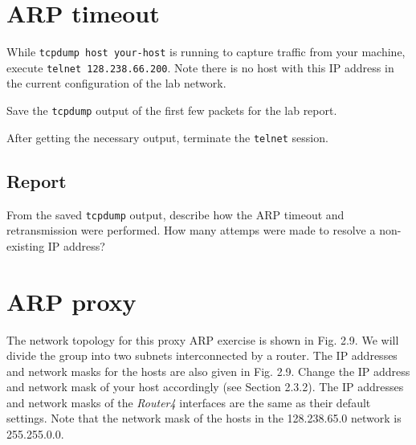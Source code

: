 \documentclass{../UTNetLab}
\begin{document}
\section{ARP timeout}
    While \lstinline[emph={your-host}]{tcpdump host your-host} is running to capture traffic from your machine, execute \lstinline{telnet 128.238.66.200}.
    Note there is no host with this IP address in the current configuration of the lab network.

    Save the \lstinline{tcpdump} output of the first few packets for the lab report.

    After getting the necessary output, terminate the \lstinline{telnet} session.

    \subsection*{Report}
    From the saved \lstinline{tcpdump} output, describe how the ARP timeout and retransmission were performed.
    How many attemps were made to resolve a non-existing IP address?

\section{ARP proxy}
    The network topology for this proxy ARP exercise is shown in Fig. 2.9. We will divide the group into two subnets interconnected by a router. The IP addresses and network masks for the hosts are also given in Fig. 2.9. Change the IP address and network mask of your host accordingly (see Section 2.3.2). The IP addresses and network masks of the \textit{Router4} interfaces are the same as their default settings.
    Note that the network mask of the hosts in the 128.238.65.0 network is 255.255.0.0.
\end{document}
